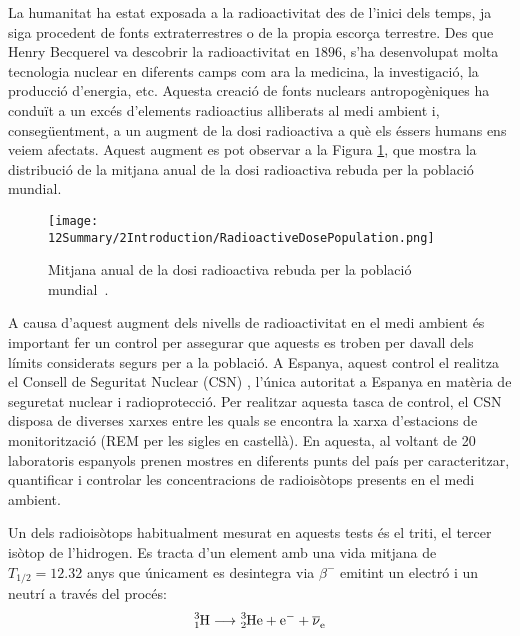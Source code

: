 La humanitat ha estat exposada a la radioactivitat des de l'inici dels temps, ja siga procedent de fonts extraterrestres o de la propia escorça terrestre. Des que Henry Becquerel va descobrir la radioactivitat en $1896$, s'ha desenvolupat molta tecnologia nuclear en diferents camps com ara la medicina, la investigació, la producció d'energia, etc. Aquesta creació de fonts nuclears antropogèniques ha conduït a un excés d'elements radioactius alliberats al medi ambient i, consegüentment, a un augment de la dosi radioactiva a què els éssers humans ens veiem afectats. Aquest augment es pot observar a la Figura  \ref{fig:DosiRadioactiva}, que mostra la distribució de la mitjana anual de la dosi radioactiva rebuda per la població mundial.

\begin{figure}[h]
\texttt{[image: 12Summary/2Introduction/RadioactiveDosePopulation.png]}
\centering
\caption{Mitjana anual de la dosi radioactiva rebuda per la població mundial~\cite{IAEA}\label{fig:DosiRadioactiva}.}
\end{figure}

A causa d'aquest augment dels nivells de radioactivitat en el medi ambient és important fer un control per assegurar que aquests es troben per davall dels límits considerats segurs per a la població. A Espanya, aquest control el realitza el Consell de Seguritat Nuclear (CSN) \cite{CSN}, l'única autoritat a Espanya en matèria de seguretat nuclear i radioprotecció. Per realitzar aquesta tasca de control, el CSN disposa de diverses xarxes entre les quals se encontra la xarxa d'estacions de monitorització (REM per les sigles en castellà). En aquesta, al voltant de 20 laboratoris espanyols prenen mostres en diferents punts del país per caracteritzar, quantificar i controlar les concentracions de radioisòtops presents en el medi ambient.

Un dels radioisòtops habitualment mesurat en aquests tests és el triti, el tercer isòtop de l'hidrogen. Es tracta d'un element amb una vida mitjana de $T_{1/2} = 12.32$ anys que únicament es desintegra via $\beta^{-}$ emitint un electró i un neutrí a través del procés:
\begin{equation}
\ce{^{3}_{1}H} \longrightarrow \ce{^{3}_{2}He}  + \ce{e^-}  + \ce{\overline{\nu}_e}
\label{eq:DecaimentTriti}
\end{equation}

